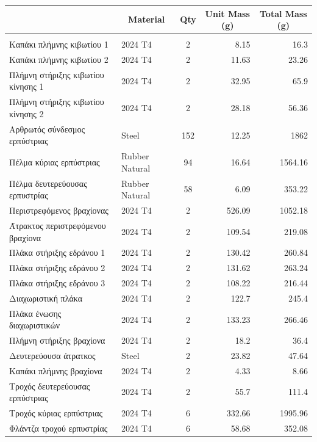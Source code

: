 \begin{table}[H]
    \centering
\begin{tabular}{|l|l|c|r|r|}
\hline
\rowcolor{Periwinkle}
\multicolumn{1}{|c|}{Part} & \multicolumn{1}{c|}{Material} & \multicolumn{1}{c|}{Qty} & \multicolumn{1}{c|}{Unit Mass (g)} & \multicolumn{1}{c|}{Total Mass (g)} \\
\hline
\rowcolor{YellowGreen}
\multicolumn{5}{|c|}{Mobility Subsystem} \\
\hline
Καπάκι πλήμνης κιβωτίου 1 & 2024 T4 & 2 & 8.15 & 16.3 \\
\hline
Καπάκι πλήμνης κιβωτίου 2 & 2024 T4 & 2 & 11.63 & 23.26 \\
\hline
Πλήμνη στήριξης κιβωτίου κίνησης 1 & 2024 T4 & 2 & 32.95 & 65.9 \\
\hline
Πλήμνη στήριξης κιβωτίου κίνησης 2 & 2024 T4 & 2 & 28.18 & 56.36 \\
\hline
Αρθρωτός σύνδεσμος ερπύστριας & Steel & 152 & 12.25 & 1862 \\
\hline
Πέλμα κύριας ερπύστριας & Rubber Natural & 94 & 16.64 & 1564.16 \\
\hline
Πέλμα δευτερεύουσας ερπυστρίας & Rubber Natural & 58 & 6.09 & 353.22 \\
\hline
Περιστρεφόμενος βραχίονας & 2024 T4 & 2 & 526.09 & 1052.18 \\
\hline
Άτρακτος περιστρεφόμενου βραχίονα & 2024 T4 & 2 & 109.54 & 219.08 \\
\hline
Πλάκα στήριξης εδράνου 1 & 2024 T4 & 2 & 130.42 & 260.84 \\
\hline
Πλάκα στήριξης εδράνου 2 & 2024 T4 & 2 & 131.62 & 263.24 \\
\hline
Πλάκα στήριξης εδράνου 3 & 2024 T4 & 2 & 108.22 & 216.44 \\
\hline
Διαχωριστική πλάκα & 2024 T4 & 2 & 122.7 & 245.4 \\
\hline
Πλάκα ένωσης διαχωριστικών & 2024 T4 & 2 & 133.23 & 266.46 \\
\hline
Πλήμνη στήριξης βραχίονα & 2024 T4 & 2 & 18.2 & 36.4 \\
\hline
Δευτερεύουσα άτρατκος & Steel & 2 & 23.82 & 47.64 \\
\hline
Καπάκι πλήμνης βραχίονα & 2024 T4 & 2 & 4.33 & 8.66 \\
\hline
Τροχός δευτερεύουσας ερπύστριας & 2024 T4 & 2 & 55.7 & 111.4 \\
\hline
Τροχός κύριας ερπύστριας & 2024 T4 & 6 & 332.66 & 1995.96 \\
\hline
Φλάντζα τροχού ερπυστρίας & 2024 T4 & 6 & 58.68 &352.08 \\

\end{tabular}
\end{table}
